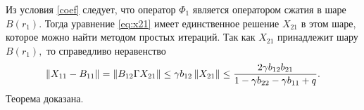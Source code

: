 Из условия \eqref{coef} следует, что оператор $\Phi_1$ является оператором сжатия в шаре $B(r_1).$ Тогда уравнение \eqref{eq:x21} имеет единственное решение $X_{21}$ в этом шаре, которое можно найти методом простых итераций. Так как $X_{21}$ принадлежит шару $B(r_1),$ то справедливо неравенство
\begin{align*}
\left\|X_{11} - B_{11}\right\| = \left\|B_{12}\Gamma X_{21}\right\| \leq \gamma b_{12} \left\|X_{21}\right\| \leq \frac{2\gamma b_{12}b_{21}}{1 - \gamma b_{22} - \gamma b_{11} + q}.
\end{align*}
Теорема доказана.
\hfill

